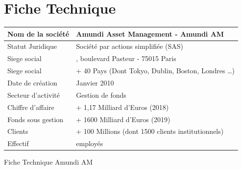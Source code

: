 \section{Fiche Technique}

\begin{center}
    \begin{tabularx}{0.8\textwidth} { 
        | >{\raggedright\arraybackslash}X
        | >{\centering\arraybackslash}X | }
    \hline
    Nom de la société   &   Amundi Asset Management - Amundi AM \\
    \hline
    Statut Juridique    &   Société par actions simplifiée (SAS)  \\
    \hline
    Siege social        &   90, boulevard Pasteur - 75015 Paris  \\
    \hline
    Siege social        &   + 40 Pays (Dont Tokyo, Dublin, Boston, Londres \dots) \\
    \hline
    Date de création    &   Janvier 2010  \\
    \hline
    Secteur d’activité  &   Gestion de fonds  \\
    \hline
    Chiffre d’affaire   &   + 1,17 Milliard d'Euros (2018)  \\
    \hline
    Fonds sous gestion  &   + 1600 Milliard d'Euros (2019)  \\
    \hline
    Clients             &   + 100 Millions (dont 1500 clients institutionnels)  \\
    \hline
    Effectif            &   2000 employés\\
    \hline
    \end{tabularx}
    \begin{table}[htp]
        \caption{Fiche Technique Amundi AM}
    \end{table}
\end{center}